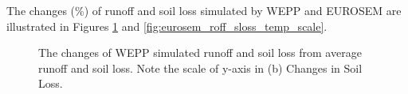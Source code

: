 The changes (\%) of runoff and soil loss simulated by WEPP and EUROSEM are
illustrated in Figures \ref{fig:wepp_roff_sloss_temp_scale} and
\ref{fig:eurosem_roff_sloss_temp_scale}.

\begin{figure}[htbp]
  \centering
    \qquad
  \caption[WEPP runoff and soil loss changes]{The changes of WEPP simulated
runoff and soil loss from average runoff and soil loss. Note the scale of y-axis
in (b) Changes in Soil Loss.}
  \label{fig:wepp_roff_sloss_temp_scale}
\end{figure}

